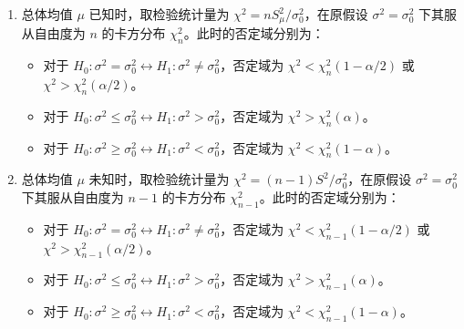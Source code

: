 \begin{proposition}[单个正态总体方差的假设检验]\label{prop:single_normal_variance_hypothesis_test}
    \begin{enumerate}
        \item 总体均值 $\mu$ 已知时，取检验统计量为 $\chi^2 = nS_\mu^2/\sigma_0^2$，在原假设 $\sigma^2=\sigma_0^2$ 下其服从自由度为 $n$ 的卡方分布 $\chi_n^2$。此时的否定域分别为：
        \begin{itemize}
            \item 对于 $H_0: \sigma^2 = \sigma_0^2 \leftrightarrow H_1: \sigma^2 \ne \sigma_0^2$，否定域为 $\chi^2 < \chi_n^2(1-\alpha/2)$ 或 $\chi^2 > \chi_n^2(\alpha/2)$。
            \item 对于 $H_0: \sigma^2 \le \sigma_0^2 \leftrightarrow H_1: \sigma^2 > \sigma_0^2$，否定域为 $\chi^2 > \chi_n^2(\alpha)$。
            \item 对于 $H_0: \sigma^2 \ge \sigma_0^2 \leftrightarrow H_1: \sigma^2 < \sigma_0^2$，否定域为 $\chi^2 < \chi_n^2(1-\alpha)$。
        \end{itemize}
        \item 总体均值 $\mu$ 未知时，取检验统计量为 $\chi^2 = (n-1)S^2/\sigma_0^2$，在原假设 $\sigma^2=\sigma_0^2$ 下其服从自由度为 $n-1$ 的卡方分布 $\chi_{n-1}^2$。此时的否定域分别为：
        \begin{itemize}
            \item 对于 $H_0: \sigma^2 = \sigma_0^2 \leftrightarrow H_1: \sigma^2 \ne \sigma_0^2$，否定域为 $\chi^2 < \chi_{n-1}^2(1-\alpha/2)$ 或 $\chi^2 > \chi_{n-1}^2(\alpha/2)$。
            \item 对于 $H_0: \sigma^2 \le \sigma_0^2 \leftrightarrow H_1: \sigma^2 > \sigma_0^2$，否定域为 $\chi^2 > \chi_{n-1}^2(\alpha)$。
            \item 对于 $H_0: \sigma^2 \ge \sigma_0^2 \leftrightarrow H_1: \sigma^2 < \sigma_0^2$，否定域为 $\chi^2 < \chi_{n-1}^2(1-\alpha)$。
        \end{itemize}
    \end{enumerate}
\end{proposition}


